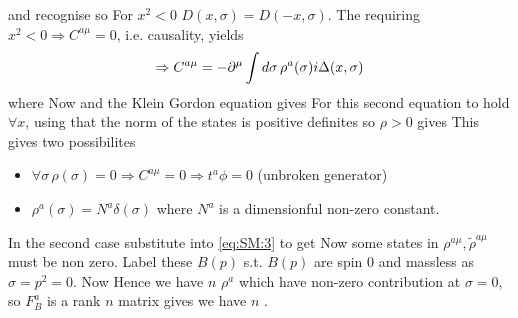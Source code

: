\documentclass{article}
\begin{document}
and recognise 
so 
For $x^2 < 0$ $D(x,\sigma) = D(-x,\sigma)$. The requiring $x^2 < 0 \Rightarrow C^{a\mu}=0$, i.e. causality, yields 
\begin{align}\label{eq:SM:3}
\Rightarrow C^{a\mu} = -\partial^\mu \int d\sigma \, \rho^a(\sigma) i \Delta(x,\sigma)
\end{align}
where 
Now 
and the Klein Gordon equation gives 
For this second equation to hold $\forall x$, using that the norm of the states is positive definites so $\rho > 0$ gives 
This gives two possibilites 
\begin{itemize}
    \item $\forall \sigma \, \rho(\sigma) = 0 \Rightarrow C^{a\mu} = 0 \Rightarrow t^a \phi = 0 $ (unbroken generator) 
    \item $\rho^a(\sigma) = N^a \delta(\sigma)$ where $N^a$ is a dimensionful non-zero constant. 
\end{itemize}
In the second case substitute into  \ref{eq:SM:3} to get 
Now some states in $\rho^{a\mu},\tilde{\rho}^{a\mu}$ must be non zero. Label these $B(p)$ s.t. 
$B(p)$ are spin 0 and massless as $\sigma = p^2 = 0$. Now 
Hence we have $n$ $\rho^a$ which have non-zero contribution at $\sigma = 0$, so $F_B^a$ is a rank $n$ matrix gives we have $n$ . \\
\end{document}
